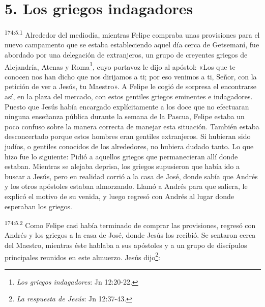 \section*{5. Los griegos indagadores}
\par
\textsuperscript{174:5.1} Alrededor del mediodía, mientras Felipe compraba unas provisiones para el nuevo campamento que se estaba estableciendo aquel día cerca de Getsemaní, fue abordado por una delegación de extranjeros, un grupo de creyentes griegos de Alejandría, Atenas y Roma\footnote{\textit{Los griegos indagadores}: Jn 12:20-22.}, cuyo portavoz le dijo al apóstol: «Los que te conocen nos han dicho que nos dirijamos a ti; por eso venimos a ti, Señor, con la petición de ver a Jesús, tu Maestro». A Felipe le cogió de sorpresa el encontrarse así, en la plaza del mercado, con estos gentiles griegos eminentes e indagadores. Puesto que Jesús había encargado explícitamente a los doce que no efectuaran ninguna enseñanza pública durante la semana de la Pascua, Felipe estaba un poco confuso sobre la manera correcta de manejar esta situación. También estaba desconcertado porque estos hombres eran gentiles extranjeros. Si hubieran sido judíos, o gentiles conocidos de los alrededores, no hubiera dudado tanto. Lo que hizo fue lo siguiente: Pidió a aquellos griegos que permanecieran allí donde estaban. Mientras se alejaba deprisa, los griegos supusieron que había ido a buscar a Jesús, pero en realidad corrió a la casa de José, donde sabía que Andrés y los otros apóstoles estaban almorzando. Llamó a Andrés para que saliera, le explicó el motivo de su venida, y luego regresó con Andrés al lugar donde esperaban los griegos.

\par
\textsuperscript{174:5.2} Como Felipe casi había terminado de comprar las provisiones, regresó con Andrés y los griegos a la casa de José, donde Jesús los recibió. Se sentaron cerca del Maestro, mientras éste hablaba a sus apóstoles y a un grupo de discípulos principales reunidos en este almuerzo. Jesús dijo\footnote{\textit{La respuesta de Jesús}: Jn 12:37-43.}:

